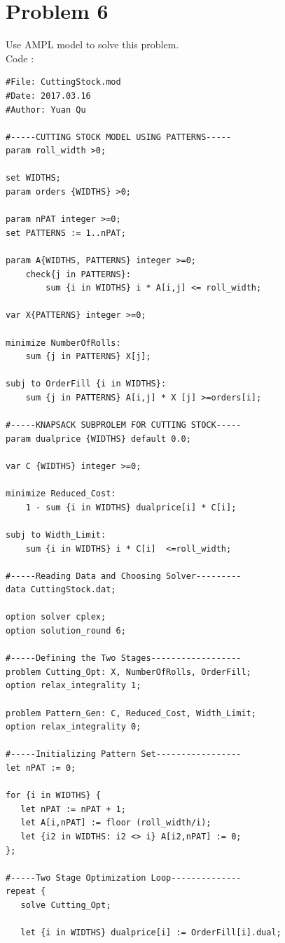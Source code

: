 \documentclass{article}
\begin{document}
\section*{Problem 6}{
    Use AMPL model to solve this problem. \\

    Code :

    \begin{lstlisting}[language=AMPL]
#File: CuttingStock.mod
#Date: 2017.03.16
#Author: Yuan Qu

#-----CUTTING STOCK MODEL USING PATTERNS-----
param roll_width >0;

set WIDTHS;
param orders {WIDTHS} >0;

param nPAT integer >=0;
set PATTERNS := 1..nPAT;

param A{WIDTHS, PATTERNS} integer >=0;
    check{j in PATTERNS}:
        sum {i in WIDTHS} i * A[i,j] <= roll_width;
        
var X{PATTERNS} integer >=0;

minimize NumberOfRolls:
    sum {j in PATTERNS} X[j];

subj to OrderFill {i in WIDTHS}:
    sum {j in PATTERNS} A[i,j] * X [j] >=orders[i];

#-----KNAPSACK SUBPROLEM FOR CUTTING STOCK-----
param dualprice {WIDTHS} default 0.0;

var C {WIDTHS} integer >=0;

minimize Reduced_Cost:
    1 - sum {i in WIDTHS} dualprice[i] * C[i];

subj to Width_Limit:
    sum {i in WIDTHS} i * C[i]  <=roll_width;

#-----Reading Data and Choosing Solver---------
data CuttingStock.dat;

option solver cplex;
option solution_round 6;

#-----Defining the Two Stages------------------
problem Cutting_Opt: X, NumberOfRolls, OrderFill;
option relax_integrality 1;

problem Pattern_Gen: C, Reduced_Cost, Width_Limit;
option relax_integrality 0;

#-----Initializing Pattern Set-----------------
let nPAT := 0;

for {i in WIDTHS} {
   let nPAT := nPAT + 1;
   let A[i,nPAT] := floor (roll_width/i);
   let {i2 in WIDTHS: i2 <> i} A[i2,nPAT] := 0;
};

#-----Two Stage Optimization Loop--------------
repeat {
   solve Cutting_Opt;

   let {i in WIDTHS} dualprice[i] := OrderFill[i].dual;


\end{lstlisting}}
\end{document}
